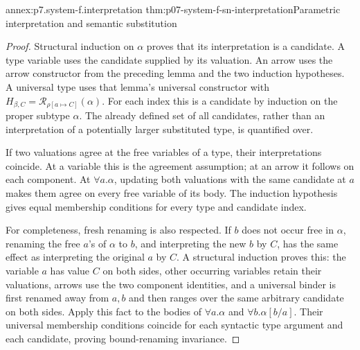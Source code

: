 \begin{annexitem}{annex:p7.system-f.interpretation}
 {thm:p07-system-f-sn-interpretation}{Parametric interpretation and semantic substitution}
\begin{proof}
Structural induction on \(\alpha\) proves that its interpretation is
a candidate. A type variable uses the candidate supplied by its valuation.
An arrow uses the arrow constructor from the preceding lemma and the two
induction hypotheses. A universal type uses that lemma's universal
constructor with
\(H_{\beta,C}=\mathcal R_{\rho[a\mapsto C]}(\alpha)\).
For each index this is a candidate by induction on the proper subtype
\(\alpha\). The already defined set of all candidates, rather than an
interpretation of a potentially larger substituted type, is quantified over.

If two valuations agree at the free variables of a type, their
interpretations coincide. At a variable this is the agreement assumption;
at an arrow it follows on each component. At \(\forall a.\alpha\),
updating both valuations with the same candidate at \(a\) makes them
agree on every free variable of its body. The induction hypothesis gives
equal membership conditions for every type and candidate index.

For completeness, fresh renaming is also respected. If \(b\) does not
occur free in \(\alpha\), renaming the free \(a\)'s of \(\alpha\)
to \(b\), and interpreting the new \(b\) by \(C\), has the same
effect as interpreting the original \(a\) by \(C\). A structural
induction proves this: the variable \(a\) has value \(C\) on both
sides, other occurring variables retain their valuations, arrows use the
two component identities, and a universal binder is first renamed away
from \(a,b\) and then ranges over the same arbitrary candidate on both
sides. Apply this fact to the bodies of \(\forall a.\alpha\) and
\(\forall b.\alpha[b/a]\). Their universal membership conditions
coincide for each syntactic type argument and each candidate, proving
bound-renaming invariance.


\end{proof}
\end{annexitem}
